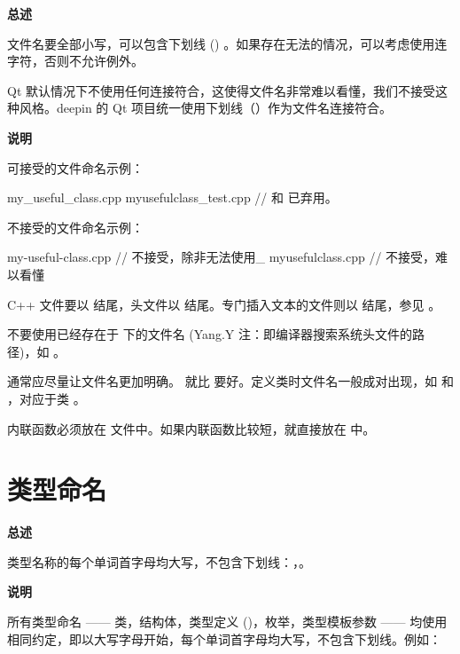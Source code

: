 \textbf{总述}

文件名要全部小写，可以包含下划线 (\cppinline{_}) 。如果存在无法\cppinline{_}的情况，可以考虑使用连字符\cppinline{-}，否则不允许例外。

\begin{DWarn}
  Qt 默认情况下不使用任何连接符合，这使得文件名非常难以看懂，我们不接受这种风格。deepin 的 Qt 项目统一使用下划线（\cppinline{_}）作为文件名连接符合。
\end{DWarn}

\textbf{说明}

可接受的文件命名示例：

\begin{cppcode}
  my_useful_class.cpp
  myusefulclass_test.cpp //  和  已弃用。
\end{cppcode}

不接受的文件命名示例：

\begin{cppcode}
  my-useful-class.cpp  // 不接受，除非无法使用_
  myusefulclass.cpp    // 不接受，难以看懂
\end{cppcode}

C++ 文件要以  结尾，头文件以  结尾。专门插入文本的文件则以  结尾，参见 。

不要使用已经存在于  下的文件名 (Yang.Y 注：即编译器搜索系统头文件的路径)，如 。

通常应尽量让文件名更加明确。 就比  要好。定义类时文件名一般成对出现，如  和 ，对应于类 。

内联函数必须放在  文件中。如果内联函数比较短，就直接放在  中。

\section{类型命名} \label{type-names}

\textbf{总述}

类型名称的每个单词首字母均大写，不包含下划线：，。

\textbf{说明}

所有类型命名 —— 类，结构体，类型定义 ()，枚举，类型模板参数 —— 均使用相同约定，即以大写字母开始，每个单词首字母均大写，不包含下划线。例如：

